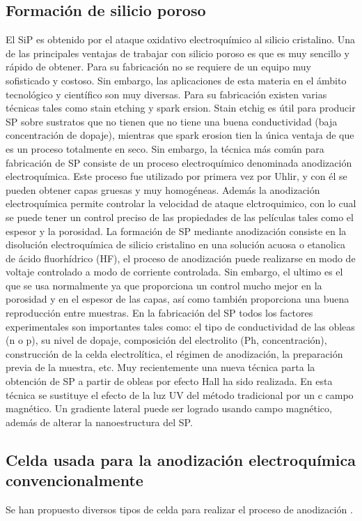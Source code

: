 \documentclass[a4paper,11pt,]{book}
\begin{document}
\subsection{Formación de silicio poroso}
El SiP es obtenido por el ataque oxidativo electroquímico al silicio cristalino. Una de las principales ventajas de trabajar con silicio poroso es que es muy sencillo y rápido de obtener. Para su fabricación no se requiere de un equipo muy sofisticado y costoso. Sin embargo, las aplicaciones de esta materia en el ámbito tecnológico y científico son muy diversas. Para su fabricación existen varias técnicas tales como stain etching y spark ersion. Stain etchig es útil para producir SP sobre sustratos que no tienen que no tiene una buena conductividad (baja concentración de dopaje), mientras que spark erosion tien la única ventaja de que es un proceso totalmente en seco. Sin embargo, la técnica más común para fabricación de SP consiste de un proceso electroquímico denominada anodización electroquímica. Este proceso fue utilizado por primera vez por Uhlir\cite{I101}, y con él se pueden obtener capas gruesas y muy homogéneas. Además la anodización electroquímica permite controlar la velocidad de ataque elctroquimico, con lo cual se puede tener un control preciso de las propiedades de las películas tales como el espesor y la porosidad. La formación de SP mediante anodización consiste en la disolución electroquímica de silicio cristalino en una solución acuosa o etanolica de ácido fluorhídrico (HF), el proceso de anodización puede realizarse en modo de voltaje controlado a modo de corriente controlada. Sin embargo, el ultimo es el que se usa normalmente ya que proporciona un control mucho mejor en la porosidad y en el espesor de las capas, así como también proporciona una buena reproducción entre muestras. En la fabricación del SP todos los factores experimentales son importantes tales como: el tipo de conductividad de las obleas (n o p), su nivel de dopaje, composición del electrolito (Ph, concentración), construcción de la celda electrolítica, el régimen de anodización, la preparación previa de la muestra, etc. Muy recientemente una nueva técnica parta la obtención de SP a partir de obleas por efecto Hall ha sido realizada. En esta técnica se sustituye el efecto de la luz UV  del método tradicional por un c campo magnético. Un gradiente lateral puede ser logrado usando campo magnético, además de alterar la nanoestructura del SP.

\subsection{Celda usada para la anodización electroquímica convencionalmente} 
Se han propuesto diversos tipos de celda para realizar el proceso de anodización \cite{109}.  
\end{document}
